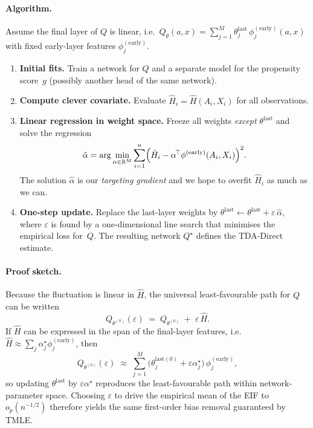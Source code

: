 \documentclass{article}
\theoremstyle{remark}
\begin{document}
\paragraph{Algorithm.}
Assume the final layer of $Q$ is linear, i.e.\ 
$
  Q_{\theta}(a,x)=\sum_{j=1}^{M}\theta^{\mathrm{last}}_{j}\,
  \phi_{j}^{(\mathrm{early})}(a,x)
$
with fixed early-layer features $\phi_{j}^{(\mathrm{early})}$.
\begin{enumerate}[leftmargin=1.65em,label=(\arabic*)]
  \item \textbf{Initial fits.}  
        Train a network for $Q$ and a separate model for the propensity
        score~$g$ (possibly another head of the same network).
  \item \textbf{Compute clever covariate.}  
        Evaluate $\hat{H}_i = \hat{H}(A_i,X_i)$ for all observations.
  \item \textbf{Linear regression in weight space.}  
        Freeze all weights \emph{except} $\theta^{\mathrm{last}}$ and solve
        the regression
        \[
          \hat{\alpha}
            =\arg\min_{\alpha\in\mathbb{R}^{M}}
            \sum_{i=1}^{n}
            \Bigl(\hat{H}_i-\alpha^{\!\top}\phi^{(\mathrm{early})}(A_i,X_i)
            \Bigr)^{2}.
        \]
        The solution $\hat{\alpha}$ is our \emph{targeting gradient} and we hope to overfit $\hat{H}_i$ as much as we can.
        
  \item \textbf{One-step update.}  
        Replace the last-layer weights by
        $
          \theta^{\mathrm{last}} \leftarrow
          \theta^{\mathrm{last}}+\varepsilon\,\hat{\alpha},
        $
        where $\varepsilon$ is found by a one-dimensional line search that
        minimises the empirical loss for~$Q$.
        The resulting network $Q^{\star}$ defines the TDA-Direct estimate.
\end{enumerate}

\paragraph{Proof sketch.}
Because the fluctuation is linear in $\hat{H}$, the universal least-favourable
path for $Q$ can be written
\[
  Q_{\theta^{(0)}}(\varepsilon)
  \;=\;
  Q_{\theta^{(0)}} \;+\; \varepsilon\,\hat{H}.
\]
If $\hat{H}$ can be expressed in the span of the final-layer features,
i.e.\ $\hat{H}\approx\sum_{j}\alpha^{\star}_j\phi^{(\mathrm{early})}_j$, then
\[
  Q_{\theta^{(0)}}(\varepsilon)
  \;\approx\;
  \sum_{j=1}^{M}
  \bigl(\theta^{\mathrm{last}(0)}_{j}+\varepsilon\alpha^{\star}_j\bigr)\,
  \phi^{(\mathrm{early})}_j,
\]
so updating $\theta^{\mathrm{last}}$ by $\varepsilon\alpha^{\star}$ reproduces
the least-favourable path within network‐parameter space.  Choosing
$\varepsilon$ to drive the empirical mean of the EIF to $o_{\!p}(n^{-1/2})$
therefore yields the same first-order bias removal guaranteed by TMLE.
\end{document}
